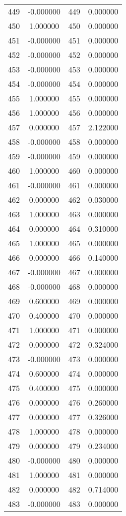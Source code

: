 \documentclass[12pt]{article}
\begin{document}
\begin{longtable}{@{}cccc@{}}
449 & -0.000000 & 449 & 0.000000 \\
450 & 1.000000 & 450 & 0.000000 \\
451 & -0.000000 & 451 & 0.000000 \\
452 & -0.000000 & 452 & 0.000000 \\
453 & -0.000000 & 453 & 0.000000 \\
454 & -0.000000 & 454 & 0.000000 \\
455 & 1.000000 & 455 & 0.000000 \\
456 & 1.000000 & 456 & 0.000000 \\
457 & 0.000000 & 457 & 2.122000 \\
458 & -0.000000 & 458 & 0.000000 \\
459 & -0.000000 & 459 & 0.000000 \\
460 & 1.000000 & 460 & 0.000000 \\
461 & -0.000000 & 461 & 0.000000 \\
462 & 0.000000 & 462 & 0.030000 \\
463 & 1.000000 & 463 & 0.000000 \\
464 & 0.000000 & 464 & 0.310000 \\
465 & 1.000000 & 465 & 0.000000 \\
466 & 0.000000 & 466 & 0.140000 \\
467 & -0.000000 & 467 & 0.000000 \\
468 & -0.000000 & 468 & 0.000000 \\
469 & 0.600000 & 469 & 0.000000 \\
470 & 0.400000 & 470 & 0.000000 \\
471 & 1.000000 & 471 & 0.000000 \\
472 & 0.000000 & 472 & 0.324000 \\
473 & -0.000000 & 473 & 0.000000 \\
474 & 0.600000 & 474 & 0.000000 \\
475 & 0.400000 & 475 & 0.000000 \\
476 & 0.000000 & 476 & 0.260000 \\
477 & 0.000000 & 477 & 0.326000 \\
478 & 1.000000 & 478 & 0.000000 \\
479 & 0.000000 & 479 & 0.234000 \\
480 & -0.000000 & 480 & 0.000000 \\
481 & 1.000000 & 481 & 0.000000 \\
482 & 0.000000 & 482 & 0.714000 \\
483 & -0.000000 & 483 & 0.000000 \\

\end{longtable}
\end{document}
